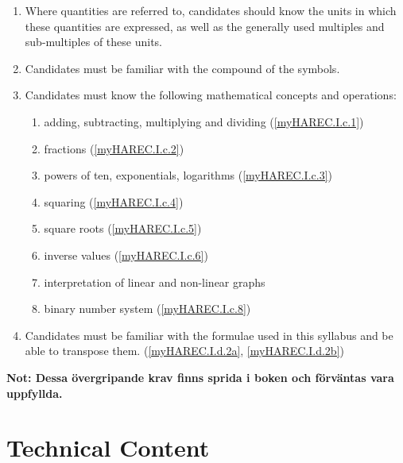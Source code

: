 \begin{enumerate}[label=\alph*]
\item Where quantities are referred to, candidates should know the units in
  which these quantities are expressed, as well as the generally used multiples
  and sub-multiples of these units.
\item Candidates must be familiar with the compound of the symbols.
\item Candidates must know the following mathematical concepts and operations:
\begin{enumerate}
\item adding, subtracting, multiplying and dividing (\ref{myHAREC.I.c.1})\label{HAREC.I.c.1}
\item fractions (\ref{myHAREC.I.c.2})\label{HAREC.I.c.2}
\item powers of ten, exponentials, logarithms (\ref{myHAREC.I.c.3})\label{HAREC.I.c.3}
\item squaring (\ref{myHAREC.I.c.4})\label{HAREC.I.c.4}
\item square roots (\ref{myHAREC.I.c.5})\label{HAREC.I.c.5}
\item inverse values (\ref{myHAREC.I.c.6})\label{HAREC.I.c.6}
\item interpretation of linear and non-linear graphs
\item binary number system (\ref{myHAREC.I.c.8})\label{HAREC.I.c.8}
\end{enumerate}
\item Candidates must be familiar with the formulae used in this syllabus and
  be able to transpose them. (\ref{myHAREC.I.d.2a}, \ref{myHAREC.I.d.2b})\label{HAREC.I.d}
\end{enumerate}

\textbf{Not: Dessa övergripande krav finns sprida i boken och förväntas vara
uppfyllda.}

\section{Technical Content}

\makeatletter
\renewcommand{\labelenumi}{\theenumi.}

\renewcommand{\theenumii}{\arabic{enumii}}
\renewcommand{\labelenumii}{\theenumi.\theenumii}
\renewcommand{\p@enumii}{\theenumi.}

\renewcommand{\theenumiii}{\arabic{enumiii}}
\renewcommand{\labelenumiii}{\theenumi.\theenumii.\theenumiii}
\renewcommand{\p@enumiii}{\theenumi.\theenumii.}

